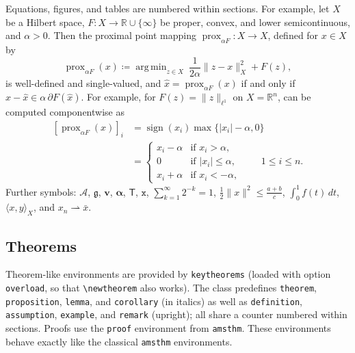 \documentclass[english,review]{jnsao}
\newcommand{\cs}[1]{\texttt{\textbackslash#1}}
\newcommand{\pkg}[1]{\texttt{#1}}
\DeclareMathOperator{\prox}{prox}
\DeclareMathOperator*{\argmin}{arg\,min}
\begin{document}
Equations, figures, and tables are numbered within sections. For example, let $X$ be a Hilbert space, $F\colon X\to\mathbb{R}\cup\{\infty\}$ be proper, convex, and lower semicontinuous, and $\alpha>0$. Then the proximal point mapping $\prox_{\alpha F}\colon X\to X$, defined for $x\in X$ by
\begin{equation}\label{eq:prox}
    \prox_{\alpha F}(x) \coloneqq \argmin_{z\in X}\ \frac{1}{2\alpha}\|z-x\|_X^2 + F(z),
\end{equation}
is well-defined and single-valued, and $\hat x = \prox_{\alpha F}(x)$ if and only if $x - \hat x \in \alpha\,\partial F(\hat x)$. For example, for $F(z) = \|z\|_{\ell^1}$ on $X=\mathbb{R}^n$,  can be computed componentwise as
\begin{equation}\label{eq:shrink}
    \begin{split}
        [\prox_{\alpha F}(x)]_i &= \operatorname{sign}(x_i)\max\{|x_i|-\alpha, 0\}\\
        &= \begin{cases}
            x_i - \alpha & \text{if } x_i > \alpha,\\
            0 & \text{if } |x_i| \leq \alpha,\\
            x_i + \alpha & \text{if } x_i < -\alpha,
        \end{cases}
        \qquad 1\leq i\leq n.
    \end{split}
\end{equation}
Further symbols: $\mathcal{A}$, $\mathfrak{g}$, $\mathbf{v}$, $\boldsymbol{\alpha}$, $\mathsf{T}$, $\mathtt{x}$, $\sum_{k=1}^\infty 2^{-k} = 1$, $\frac{1}{2}\|x\|^2 \leq \frac{a+b}{c}$, $\int_0^1 f(t)\,dt$, $\langle x, y\rangle_X$, and $x_n \rightharpoonup \bar x$.

\subsection{Theorems}\label{sec:theorems}

Theorem-like environments are provided by \pkg{keytheorems} (loaded with option \pkg{overload}, so that \cs{newtheorem} also works). The class predefines \pkg{theorem}, \pkg{proposition}, \pkg{lemma}, and \pkg{corollary} (in italics) as well as \pkg{definition}, \pkg{assumption}, \pkg{example}, and \pkg{remark} (upright); all share a counter numbered within sections. Proofs use the \pkg{proof} environment from \pkg{amsthm}.
These environments behave exactly like the classical \pkg{amsthm} environments.
\end{document}
